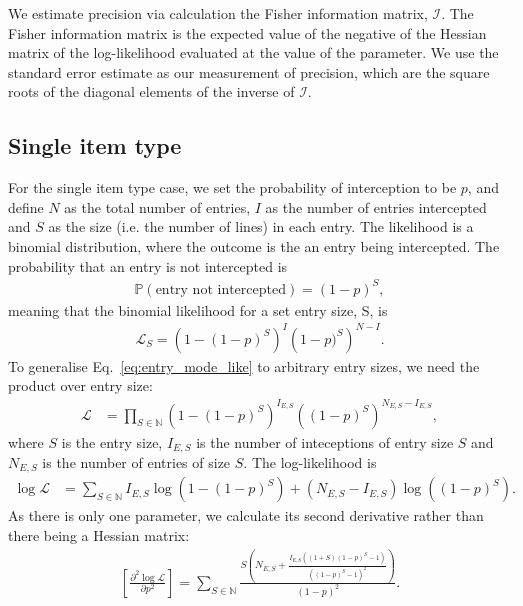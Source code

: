 \documentclass{article}
\begin{document}
We estimate precision via calculation the Fisher information matrix, \(\mathcal{I}\). The Fisher information  matrix is the expected value of the negative of the Hessian matrix of the log-likelihood evaluated at the value of the parameter. We use the standard error estimate as our measurement of precision, which are the square roots of the diagonal elements of the inverse of \(\mathcal{I}\).

\subsection{Single item type}
For the single item type case, we set the probability of interception to be \(p\), and define \(N\) as the total number of entries, \(I\) as the number of entries intercepted and \(S\) as the size (i.e. the number of lines) in each entry. The likelihood is a binomial distribution, where the outcome is the an entry being intercepted. The probability that an entry is not intercepted is
\begin{align}
\mathbb{P}(\text{entry not intercepted}) = (1-p)^S,
\end{align}
meaning that the binomial likelihood for a set entry size, S, is
\begin{align}
\mathcal{L}_S = \left(1-(1-p)^S\right)^I\left(1-p)^S\right)^{N-I}. \label{eq:entry_mode_like}
\end{align}
To generalise Eq.~\eqref{eq:entry_mode_like} to arbitrary entry sizes, we need the product over entry size:
\begin{align}
\mathcal{L}& = \prod_{S\in\mathbb{N}} \left(1-(1-p)^S\right)^{I_{E,S}}\left((1-p)^S\right)^{N_{E,S}-I_{E,S}},
\label{eq:aymptotic_full_likelihood}
\end{align}
where \(S\) is the entry size, \(I_{E,S}\) is the number of inteceptions of entry size \(S\) and \(N_{E,S}\) is the number of entries of size \(S\).  The log-likelihood is
\begin{align}
\log\mathcal{L}& = \sum_{S\in\mathbb{N}}{I_{E,S}} \log\left(1-(1-p)^S\right)+(N_{E,S}-I_{E,S})\log\left((1-p)^S\right).
\label{eq:loglikelihood_arbitrary_entry_size}
\end{align}
As there is only one parameter, we calculate its second derivative rather than there being a Hessian matrix:
\begin{align}
\left[\frac{\partial^2 \log\mathcal{L}}{\partial p^2}\right]= \sum_{S\in\mathbb{N}}
\frac{S\left(N_{E,S} + \frac{I_{E,S}((1+S)(1-p)^S-1)}
{\left((1-p)^S-1 \right)^2} \right)}
{(1-p)^2}.\label{eq:loglike_2nd_deriv}
\end{align}
\end{document}
